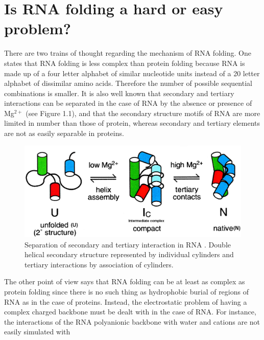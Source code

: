 \section{Is RNA folding a hard or easy problem?}
There  are  two trains  of  thought  regarding  the mechanism  of  RNA
folding.  One  states that  RNA folding is  less complex  than protein
folding  \cite{tinoco1999} because  RNA is  made up  of a  four letter
alphabet of similar  nucleotide units instead of a  20 letter alphabet
of  dissimilar   amino  acids.   Therefore  the   number  of  possible
sequential  combinations  is smaller.   It  is  also  well known  that
secondary and  tertiary interactions can  be separated in the  case of
RNA  by the absence  or presence  of Mg$^{2+}$  \cite{rangan2003} (see
Figure 1.1), and  that the secondary structure motifs  of RNA are more
limited  in  number  than  those  of protein,  whereas  secondary  and
tertiary elements are not as easily separable in proteins.
\begin{figure}[ht]
\centering
\includegraphics[scale=0.3]{Chapter1/rangan2003pnas.png}
\caption{Separation of secondary and tertiary interaction in RNA
  \cite{rangan2003}. Double helical secondary structure represented by
  individual cylinders and tertiary interactions by association of
  cylinders.}
\end{figure}
The  other point of  view says  that RNA  folding can  be at  least as
complex as protein folding \cite{moore1999a, sorin2004} since there is
no such thing  as hydrophobic burial of regions of RNA  as in the case
of proteins.  Instead, the electrostatic  problem of having  a complex
charged backbone must be dealt with in the case of RNA.
For instance,  the interactions of  the RNA polyanionic  backbone with
water  and cations  \cite{klein2004a}  are not  easily simulated  with
